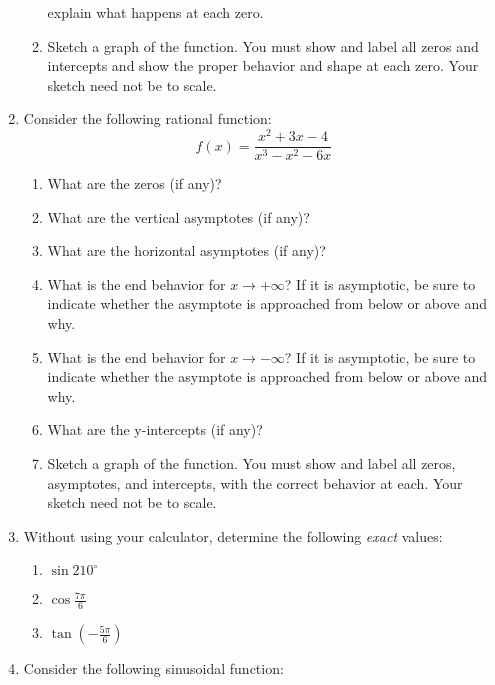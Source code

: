 \documentclass[letterpaper,12pt,fleqn]{article}
\begin{document}
\begin{enumerate}
\begin{enumerate}
explain what happens at each zero.
\vspace{2in}
\item Sketch a graph of the function. You must show and label all zeros and
intercepts and show the proper behavior and shape at each zero.  Your sketch
need not be to scale.
\end{enumerate}
\newpage
\item Consider the following rational function:
\[f(x)=\frac{x^2+3x-4}{x^3-x^2-6x}\]
\begin{enumerate}
\item What are the zeros (if any)?
\vspace{1in}
\item What are the vertical asymptotes (if any)?
\vspace{1in}
\item What are the horizontal asymptotes (if any)?
\vspace{1in}
\item What is the end behavior for $x\to+\infty$? If it is asymptotic, be
sure to indicate whether the asymptote is approached from below or above and
why.
\vspace{1in}
\item What is the end behavior for $x\to-\infty$? If it is asymptotic, be
sure to indicate whether the asymptote is approached from below or above and
why.
\vspace{1in}
\item What are the y-intercepts (if any)?
\vspace{1in}
\item Sketch a graph of the function. You must show and label all zeros,
asymptotes, and intercepts, with the correct behavior at each.  Your sketch
need not be to scale.
\end{enumerate}
\vspace{4in}
\item Without using your calculator, determine the following \emph{exact}
values:
\begin{enumerate}
\item $\sin210^{\circ}$
\vspace{1in}
\item $\cos\frac{7\pi}{6}$
\vspace{1in}
\item $\tan\left(-\frac{5\pi}{6}\right)$
\end{enumerate}
\vspace{1in}
\item Consider the following sinusoidal function:

\end{enumerate}
\end{document}
